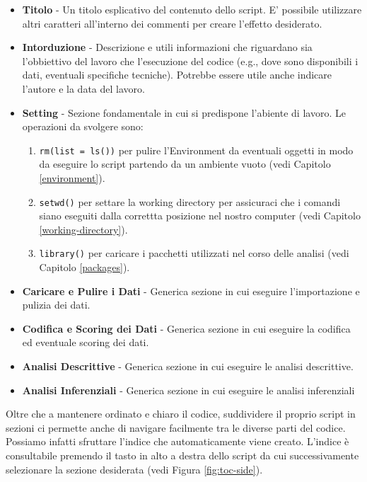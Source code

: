 \documentclass[
]{book}
\providecommand{\tightlist}{%
  \setlength{\itemsep}{0pt}\setlength{\parskip}{0pt}}
\begin{document}
\begin{itemize}
\tightlist
\item
  \textbf{Titolo} - Un titolo esplicativo del contenuto dello script. E' possibile utilizzare altri caratteri all'interno dei commenti per creare l'effetto desiderato.
\item
  \textbf{Intorduzione} - Descrizione e utili informazioni che riguardano sia l'obbiettivo del lavoro che l'esecuzione del codice (e.g., dove sono disponibili i dati, eventuali specifiche tecniche). Potrebbe essere utile anche indicare l'autore e la data del lavoro.
\item
  \textbf{Setting} - Sezione fondamentale in cui si predispone l'abiente di lavoro. Le operazioni da svolgere sono:

  \begin{enumerate}
  \def\labelenumi{\arabic{enumi}.}
  \tightlist
  \item
    \texttt{rm(list\ =\ ls())} per pulire l'Environment da eventuali oggetti in modo da eseguire lo script partendo da un ambiente vuoto (vedi Capitolo \ref{environment}).
  \item
    \texttt{setwd()} per settare la working directory per assicuraci che i comandi siano eseguiti dalla correttta posizione nel nostro computer (vedi Capitolo \ref{working-directory}).
  \item
    \texttt{library()} per caricare i pacchetti utilizzati nel corso delle analisi (vedi Capitolo \ref{packages}).
  \end{enumerate}
\item
  \textbf{Caricare e Pulire i Dati} - Generica sezione in cui eseguire l'importazione e pulizia dei dati.
\item
  \textbf{Codifica e Scoring dei Dati} - Generica sezione in cui eseguire la codifica ed eventuale scoring dei dati.
\item
  \textbf{Analisi Descrittive} - Generica sezione in cui eseguire le analisi descrittive.
\item
  \textbf{Analisi Inferenziali} - Generica sezione in cui eseguire le analisi inferenziali
\end{itemize}

Oltre che a mantenere ordinato e chiaro il codice, suddividere il proprio script in sezioni ci permette anche di navigare facilmente tra le diverse parti del codice. Possiamo infatti sfruttare l'indice che automaticamente viene creato. L'indice è consultabile premendo il tasto in alto a destra dello script da cui successivamente selezionare la sezione desiderata (vedi Figura \ref{fig:toc-side}).
\end{document}

